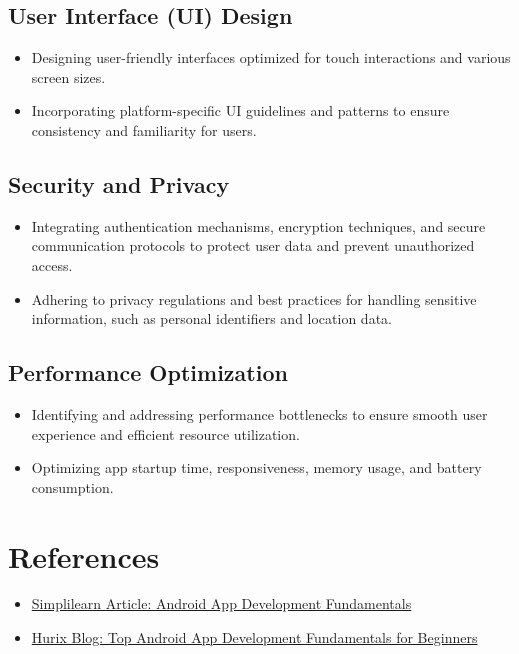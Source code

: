 \documentclass{article}
\begin{document}
\subsection{User Interface (UI) Design}

\begin{itemize}
    \item Designing user-friendly interfaces optimized for touch interactions and various screen sizes.
    \item Incorporating platform-specific UI guidelines and patterns to ensure consistency and familiarity for users.
\end{itemize}

\subsection{Security and Privacy}

\begin{itemize}
    \item Integrating authentication mechanisms, encryption techniques, and secure communication protocols to protect user data and prevent unauthorized access.
    \item Adhering to privacy regulations and best practices for handling sensitive information, such as personal identifiers and location data.
\end{itemize}

\subsection{ Performance Optimization}

\begin{itemize}
    \item Identifying and addressing performance bottlenecks to ensure smooth user experience and efficient resource utilization.
    \item Optimizing app startup time, responsiveness, memory usage, and battery consumption.
\end{itemize}

\section{References}
\begin{itemize}
    \item \href{https://www.simplilearn.com/android-app-development-fundamentals-article}{Simplilearn Article: Android App Development Fundamentals}
    \item \href{https://www.hurix.com/what-are-the-top-android-app-development-fundamentals-for-beginners/}{Hurix Blog: Top Android App Development Fundamentals for Beginners}
\end{itemize}
\end{document}
